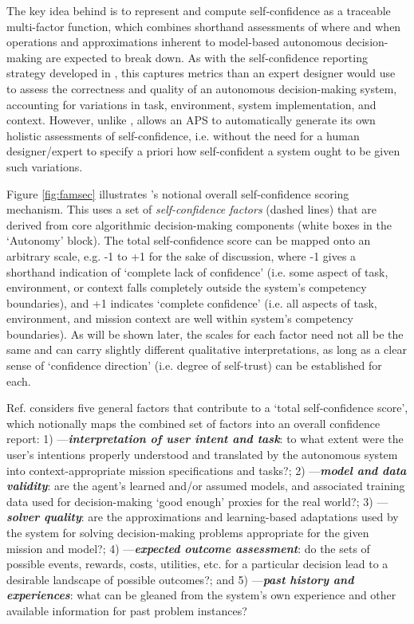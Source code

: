     The key idea behind \famsec{} is to represent and compute self-confidence as a traceable multi-factor function, which combines shorthand assessments of where and when operations and approximations inherent to model-based autonomous decision-making are expected to break down. As with the self-confidence reporting strategy developed in \cite{Hutchins2015-if}, this captures metrics than an expert designer would use to assess the correctness and quality of an autonomous decision-making system, accounting for variations in task, environment, system implementation, and context. However, unlike \cite{Hutchins2015-if}, \famsec{} allows an APS to automatically generate its own holistic assessments of self-confidence, i.e. without the need for a human designer/expert to specify a priori how self-confident a system ought to be given such variations. %
    
    Figure \ref{fig:famsec} illustrates \famsec's notional overall self-confidence scoring mechanism. This uses a set of \emph{self-confidence factors} (dashed lines) that are derived from core algorithmic decision-making components (white boxes in the `Autonomy' block). The total self-confidence score can be mapped onto an arbitrary scale, e.g. -1 to +1 for the sake of discussion, where -1 gives a shorthand indication of `complete lack of confidence' (i.e. some aspect of task, environment, or context falls completely outside the system's competency boundaries), and +1 indicates `complete confidence' (i.e. all aspects of task, environment, and mission context are well within system's competency boundaries). As will be shown later, the scales for each factor need not all be the same and can carry slightly different qualitative interpretations, as long as a clear sense of `confidence direction' (i.e. degree of self-trust) can be established for each.
    
    Ref. \cite{Aitken2016-cv} considers five general factors that contribute to a `total self-confidence score', which notionally maps the combined set of factors into an overall confidence report:
    1) \xI---\textit{\textbf{interpretation of user intent and task}}: to what extent were the user's intentions properly understood and translated by the autonomous system into context-appropriate mission specifications and tasks?; 
    2) \xM---\textit{\textbf{model and data validity}}: are the agent's learned and/or assumed models, and associated training data used for decision-making `good enough' proxies for the real world?; 
    3) \xQ---\textit{\textbf{solver quality}}: are the approximations and learning-based adaptations used by the system for solving decision-making problems appropriate for the given mission and model?; 
    4) \xO---\textit{\textbf{expected outcome assessment}}: do the sets of possible events, rewards, costs, utilities, etc. for a particular decision lead to a desirable landscape of possible outcomes?; and 
    5) \xP---\textit{\textbf{past history and experiences}}: what can be gleaned from the system's own experience and other available information for past problem instances? %

